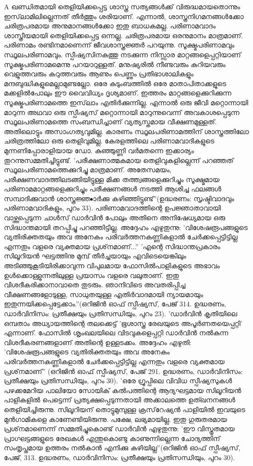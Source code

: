 A ഖണ്ഡിതമായി തെളിയിക്കപ്പെട്ട ശാസ്ത്ര സത്യങ്ങള്‍ക്ക് വിരുദ്ധമായതൊന്നും ഇസ്‌ലാമിലില്ലെന്നത് തീര്‍ത്തും ശരിയാണ്. എന്നാല്‍, ശാസ്ത്രനിഗമനങ്ങള്‍ക്കോ ചരിത്രപരമായ അനുമാനങ്ങള്‍ക്കോ ഇതു ബാധകമല്ല. പരിണാമവാദം ശാസ്ത്രീയമായി തെളിയിക്കപ്പെട്ട ഒന്നല്ല. ചരിത്രപരമായ ഒരനുമാനം മാത്രമാണ്.
പരിണാമം രണ്ടിനമാണെന്ന് ജീവശാസ്ത്രജ്ഞര്‍ പറയുന്നു. സൂക്ഷ്മപരിണാമവും സ്ഥൂലപരിണാമവും. സ്പീഷ്യസിനകത്തു നടക്കുന്ന നിസ്സാര മാറ്റങ്ങളെപ്പറ്റിയാണ് സൂക്ഷ്മപരിണാമമെന്നു പറയാറുള്ളത്. മനുഷ്യരില്‍ നീണ്ടവരും കുറിയവരും വെളുത്തവരും കറുത്തവരും ആണും പെണ്ണും പ്രതിഭാശാലികളും മന്ദബുദ്ധികളുമെല്ലാമുണ്ടല്ലോ. ഒരേ കുടുംബത്തില്‍ ഒരേ മാതാപിതാക്കളുടെ മക്കളില്‍പോലും ഈ വൈവിധ്യം ദൃശ്യമാണ്. ഇത്തരം മാറ്റങ്ങളെക്കുറിക്കുന്ന സൂക്ഷ്മപരിണാമത്തെ ഇസ്‌ലാം എതിര്‍ക്കുന്നില്ല. എന്നാല്‍ ഒരു ജീവി മറ്റൊന്നായി മാറുന്ന അഥവാ ഒരു സ്പീഷ്യസ് മറ്റൊന്നായി മാറുന്നുവെന്ന് അവകാശപ്പെടുന്ന സ്ഥൂലപരിണാമത്തെ സംബന്ധിച്ചാണ് വ്യത്യസ്തമായ വീക്ഷണമുള്ളത്. അതിലൊട്ടും അസാംഗത്യവുമില്ല. കാരണം സ്ഥൂലപരിണാമത്തിന് ശാസ്ത്രത്തിലോ ചരിത്രത്തിലോ ഒരു തെളിവുമില്ല. കേരളത്തിലെ പരിണാമവാദികളുടെ മുന്നണിപ്പോരാളിയായ ഡോ. കുഞ്ഞുണ്ണി വര്‍മതന്നെ ഇക്കാര്യം തുറന്നുസമ്മതിച്ചിട്ടുണ്ട്. 'പരീക്ഷണാത്മകമായ തെളിവുകളില്ലെന്ന് പറഞ്ഞത് സ്ഥൂലപരിണാമത്തെക്കുറിച്ചു മാത്രമാണ്. അതേസമയം, പരീക്ഷണവാദത്തിലടങ്ങിയിട്ടുള്ള മിക്ക തത്ത്വങ്ങളെക്കുറിച്ചും സൂക്ഷ്മമായ പരിണാമമാറ്റങ്ങളെക്കുറിച്ചും പരീക്ഷണങ്ങള്‍ നടത്തി ആശിച്ച ഫലങ്ങള്‍ സമ്പാദിക്കുവാന്‍ ശാസ്ത്രജ്ഞ•ാര്‍ക്കു കഴിഞ്ഞിട്ടുണ്ട്''(ഉദ്ധരണം: സൃഷ്ടിവാദവും പരിണാമവാദികളും, പുറം 33).
പരിണാമവാദത്തിന്റെ ഉപജ്ഞാതാവായി വാഴ്ത്തപ്പെടുന്ന ചാള്‍സ് ഡാര്‍വിന്‍ പോലും അതിനെ അനിഷേധ്യമായ ഒരു സിദ്ധാന്തമായി തറപ്പിച്ചു പറഞ്ഞിട്ടില്ല. അദ്ദേഹം എഴുതുന്നു: 'വിശേഷരൂപങ്ങളുടെ വ്യതിരിക്തതയും അവ അനേകം പരിവര്‍ത്തനകണ്ണികളാല്‍ ചേര്‍ക്കപ്പെട്ടിട്ടില്ല എന്നതും വളരെ വ്യക്തമായ പ്രശ്‌നമാണ്...''
'എന്റെ സിദ്ധാന്തപ്രകാരം സിലൂറിയന്‍ ഘട്ടത്തിനു മുമ്പ് തീര്‍ച്ചയായും എവിടെയെങ്കിലും അടിഞ്ഞുകൂടിയിരിക്കാവുന്ന വിപുലമായ ഫോസില്‍പാളികളുടെ അഭാവം ഉള്‍ക്കൊള്ളുന്നതിലുള്ള പ്രയാസം വളരെ വലുതാണ്. ഇതു വിശദീകരിക്കാനാവാതെ തുടരും. ഞാനിവിടെ അവതരിപ്പിച്ച വീക്ഷണങ്ങളോടുള്ള, സാധുതയുള്ള എതിര്‍വാദമായി ന്യായമായും ഇതുന്നയിക്കപ്പെട്ടേക്കാം.''(ഒറിജിന്‍ ഓഫ് സ്പീഷ്യസ്, പേജ് 314. ഉദ്ധരണം, ഡാര്‍വിനിസം: പ്രതീക്ഷയും പ്രതിസന്ധിയും, പുറം 23).
'ഡാര്‍വിന്‍ കൃതിയിലെ ഒമ്പതാം അധ്യായത്തിന്റെ തലക്കെട്ട് 'ഭൂശാസ്ത്ര രേഖയുടെ അപൂര്‍ണതയെപ്പറ്റി' എന്നാണ്. ഫോസില്‍ ശൃംഖലയിലെ വിടവുകളെപ്പറ്റി ഡാര്‍വിന്‍ നല്‍കുന്ന വിശദീകരണങ്ങളാണ് അതിന്റെ ഉള്ളടക്കം. അദ്ദേഹം എഴുതി: 'വിശേഷരൂപങ്ങളുടെ വ്യതിരിക്തതയും അവ അനേകം പരിവര്‍ത്തനകണ്ണികളാല്‍ ചേര്‍ക്കപ്പെട്ടിട്ടില്ല എന്നതും വളരെ വ്യക്തമായ പ്രശ്‌നമാണ്'' (ഒറിജിന്‍ ഓഫ് സ്പീഷ്യസ്, പേജ് 291. ഉദ്ധരണം, ഡാര്‍വിനിസം: പ്രതീക്ഷയും പ്രതിസന്ധിയും, പുറം 30).
'ഒരേ ഗ്രൂപ്പിലെ വിവിധ സ്പീഷ്യസുകള്‍ പഴക്കമേറിയ പാലിയോ സോയിക് കല്‍പത്തിന്റെ ആദ്യഘട്ടമായ സിലൂറിയന്‍ പാളികളില്‍ പെട്ടെന്ന് പ്രത്യക്ഷപ്പെടുന്നതായി അക്കാലത്തെ ഉത്ഖനനങ്ങള്‍ തെളിയിച്ചിരുന്നു. സിലൂറിയന് തൊട്ടുമുമ്പുള്ള ക്രസ്‌റേഷ്യന്‍ പാളിയില്‍ ഇവയുടെ മുന്‍ഗാമികളെ കാണേണ്ടിയിരുന്നു. പക്ഷേ, ലഭ്യമായില്ല. ഇതു ഗുരുതരമായ പ്രശ്‌നമാണെന്ന് സമ്മതിച്ചുകൊണ്ട് ഡാര്‍വിന്‍ എഴുതുന്നു: 'ഈ വിസ്തൃതമായ പ്രാഗ്ഘട്ടങ്ങളുടെ രേഖകള്‍ എന്തുകൊണ്ടു കാണുന്നില്ലെന്ന ചോദ്യത്തിന് സംതൃപ്തമായ ഉത്തരം നല്‍കാന്‍ എനിക്കു കഴിയില്ല''(ഒറിജിന്‍ ഓഫ് സ്പീഷ്യസ്, പേജ്, 313. ഉദ്ധരണം, ഡാര്‍വിനിസം: പ്രതീക്ഷയും പ്രതിസന്ധിയും, പുറം 30).
